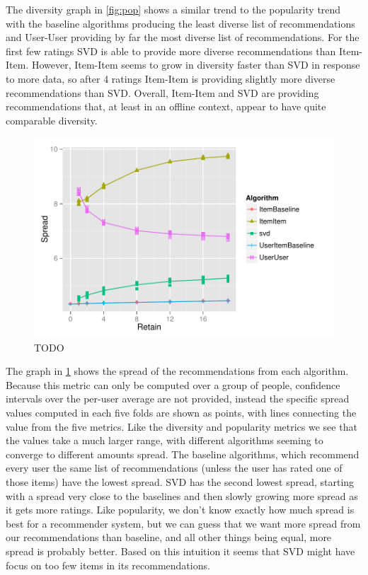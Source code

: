 \documentclass[letterpaper]{sig-alternate}
\begin{document}
  The diversity graph in \ref{fig:pop} shows a similar trend to the popularity trend with the baseline algorithms producing the least diverse list of recommendations and User-User providing by far the most diverse list of recommendations.
  For the first few ratings SVD is able to provide more diverse recommendations than Item-Item.
  However, Item-Item seems to grow in diversity faster than SVD in response to more data, so after 4 ratings Item-Item is providing slightly more diverse recommendations than SVD.
  Overall, Item-Item and SVD are providing recommendations that, at least in an offline context, appear to have quite comparable diversity.


\begin{figure}[ht!]
  \centering
  \includegraphics[width=1.1\columnwidth]{../lenskit/output/ekstrandTuned20/topN_entropy.pdf}
  \caption{TODO}
  \label{fig:spread}
\end{figure}


  The graph in \ref{fig:spread} shows the spread of the recommendations from each algorithm.
  Because this metric can only be computed over a group of people, confidence intervals over the per-user average are not provided, instead the specific spread values computed in each five folds are shown as points, with lines connecting the value from the five metrics.
  Like the diversity and popularity metrics we see that the values take a much larger range, with different algorithms seeming to converge to different amounts spread.
  The baseline algorithms, which recommend every user the same list of recommendations (unless the user has rated one of those items) have the lowest spread.
  SVD has the second lowest spread, starting with a spread very close to the baselines and then slowly growing more spread as it gets more ratings.
  Like popularity, we don't know exactly how much spread is best for a recommender system, but we can guess that we want more spread from our recommendations than baseline, and all other things being equal, more spread is probably better.
  Based on this intuition it seems that SVD might have focus on too few items in its recommendations.
\end{document}
